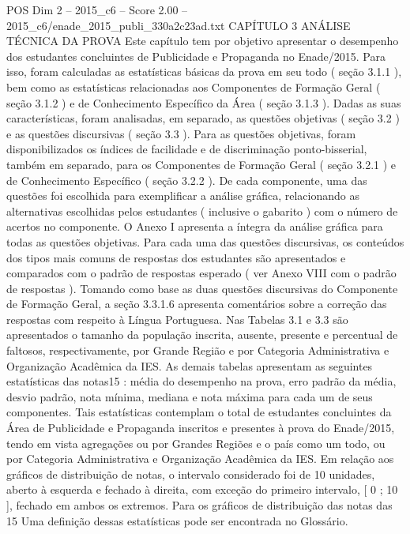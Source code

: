 \begin{textsample}{POS Dim 2 – 2015\_c6 – Score 2.00 – 2015\_c6/enade\_2015\_publi\_330a2c23ad.txt}  \label{ex:f2_pos_235}
CAPÍTULO 3 ANÁLISE TÉCNICA DA PROVA Este capítulo tem por objetivo apresentar o desempenho dos estudantes concluintes de Publicidade e Propaganda no Enade/2015.
Para isso, foram calculadas as estatísticas básicas da prova em seu todo ( seção 3.1.1 ), bem como as estatísticas relacionadas aos Componentes de Formação Geral ( seção 3.1.2 ) e de Conhecimento Específico da Área ( seção 3.1.3 ).
Dadas as suas características, foram analisadas, em separado, as questões objetivas ( seção 3.2 ) e as questões discursivas ( seção 3.3 ).
Para as questões objetivas, foram disponibilizados os índices de facilidade e de discriminação ponto-bisserial, também em separado, para os Componentes de Formação Geral ( seção 3.2.1 ) e de Conhecimento Específico ( seção 3.2.2 ).
De cada componente, uma das questões foi escolhida para exemplificar a análise gráfica, relacionando as alternativas escolhidas pelos estudantes ( inclusive o gabarito ) com o número de acertos no componente.
O Anexo I apresenta a íntegra da análise gráfica para todas as questões objetivas.
Para cada uma das questões discursivas, os conteúdos dos tipos mais comuns de respostas dos estudantes são apresentados e comparados com o padrão de respostas esperado ( ver Anexo VIII com o padrão de respostas ).
Tomando como base as duas questões discursivas do Componente de Formação Geral, a seção 3.3.1.6 apresenta comentários sobre a correção das respostas com respeito à Língua Portuguesa.
Nas Tabelas 3.1 e 3.3 são apresentados o tamanho da população inscrita, ausente, presente e percentual de faltosos, respectivamente, por Grande Região e por Categoria Administrativa e Organização Acadêmica da IES.
As demais tabelas apresentam as seguintes estatísticas das notas15 : média do desempenho na prova, erro padrão da média, desvio padrão, nota mínima, mediana e nota máxima para cada um de seus componentes.
Tais estatísticas contemplam o total de estudantes concluintes da Área de Publicidade e Propaganda inscritos e presentes à prova do Enade/2015, tendo em vista agregações ou por Grandes Regiões e o país como um todo, ou por Categoria Administrativa e Organização Acadêmica da IES.
Em relação aos gráficos de distribuição de notas, o intervalo considerado foi de 10 unidades, aberto à esquerda e fechado à direita, com exceção do primeiro intervalo, [ 0 ; 10 ], fechado em ambos os extremos.
Para os gráficos de distribuição das notas das 15 Uma definição dessas estatísticas pode ser encontrada no Glossário.

\end{textsample}
